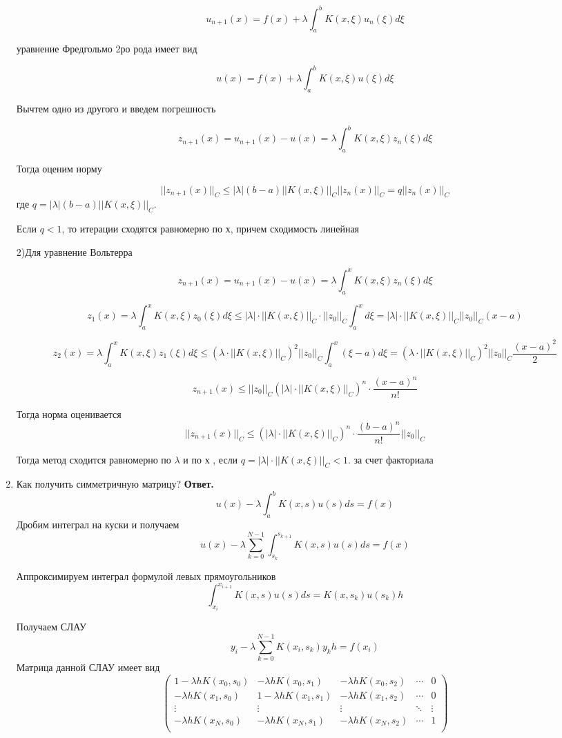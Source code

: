 \documentclass{article}
\begin{document}
\begin{enumerate}
	\[
	u_{n+1}(x) = f(x) + \lambda \int_{a}^{b}K(x, \xi) u_n(\xi) d\xi
	\]
	
	уравнение Фредгольмо 2ро рода имеет вид 
	
	\[
	u(x) = f(x) + \lambda \int_{a}^{b}K(x, \xi) u(\xi) d\xi
	\]
	
	Вычтем одно из другого и введем погрешность
	
	
	\[
	z_{n+1}(x) = u_{n+1}(x) - u(x) = \lambda \int_{a}^{b}K(x, \xi) z_n(\xi) d\xi
	\]
	
	Тогда оценим норму
	
	\[
	||z_{n+1}(x)||_C \le  |\lambda|(b-a)||K(x, \xi)||_C ||z_n(x)||_C = q ||z_n(x)||_C
	\]
	где $q = |\lambda|(b-a)||K(x, \xi)||_C$.
	
	
	Если $q<1$, то итерации сходятся равномерно по х, причем сходимость линейная
	
	
	
	2)Для уравнение Вольтерра
	
	\[
	z_{n+1}(x) = u_{n+1}(x) - u(x) = \lambda \int_{a}^{x}K(x, \xi) z_n(\xi) d\xi
	\]
	
	\[
	z_1(x) = \lambda \int_{a}^{x}K(x, \xi) z_0(\xi) d\xi \le |\lambda| \cdot ||K(x,\xi)||_C \cdot ||z_0||_C\int_{a}^{x} d\xi = |\lambda| \cdot ||K(x,\xi)||_C ||z_0||_C(x-a)
	\]
	
	\[
	z_2(x) = \lambda \int_{a}^{x}K(x, \xi) z_1(\xi) d\xi \le (\lambda \cdot||K(x,\xi)||_C )^2||z_0||_C \int_{a}^{x}(\xi-a) d\xi = (\lambda \cdot||K(x,\xi)||_C )^2||z_0||_C \frac{(x-a)^2}{2}
	\]
	
	
	\[
	z_{n+1}(x) \le ||z_0||_C(|\lambda| \cdot||K(x,\xi)||_C )^n \cdot \frac{(x-a)^n}{n!}
	\]
	
	Тогда норма оценивается 
	\[
	||z_{n+1}(x)||_C \le (|\lambda| \cdot||K(x,\xi)||_C )^n \cdot \frac{(b-a)^n}{n!}||z_0||_C
	\]
	
	Тогда метод сходится равномерно по $\lambda$ и по $х$ , если $q = |\lambda| \cdot||K(x,\xi)||_C<1$. за счет факториала
		\item Как получить симметричную матрицу?
		\newline
		{\bfseries Ответ. } 
		\[
	u(x) - \lambda \int_{a}^{b}K(x,s)u(s)ds = f(x)
	\]
	Дробим интеграл на куски и получаем
	\[
	u(x) - \lambda \sum_{k=0}^{N-1} \int_{s_k}^{s_{k+1}} K(x,s)u(s)ds = f(x)
	\]
	
	
	Аппроксимируем интеграл формулой левых прямоугольников 
	\[
	\int_{x_i}^{x_{i+1}} K(x,s)u(s)ds = K(x, s_k) u(s_k) h
	\]
	
	Получаем СЛАУ
	\[
	y_i - \lambda \sum_{k=0}^{N-1} K(x_i, s_k) y_k h = f(x_i)
	\]
	Матрица данной СЛАУ имеет вид
	\[
	\begin{pmatrix}
		1-\lambda hK(x_0, s_0) & -\lambda h K(x_0, s_1) & -\lambda h K(x_0, s_2) & \cdots & 0 \\
		-\lambda h K(x_1, s_0) & 1-\lambda h K(x_1, s_1) & -\lambda h K(x_1, s_2) & \cdots & 0 \\
		\vdots & \vdots & \vdots & \ddots & \vdots \\
		-\lambda h K(x_N, s_0) & -\lambda h K(x_N, s_1) & -\lambda h K(x_N, s_2) & \cdots & 1 \\
	\end{pmatrix}
	\]
	

\end{enumerate}
\end{document}

